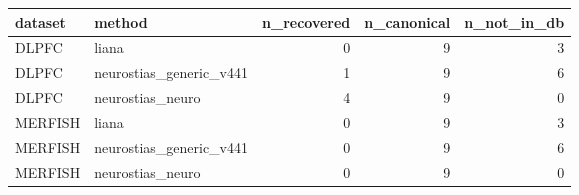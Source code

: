 \begin{tabular}{llrrr}
\toprule
dataset & method & n_recovered & n_canonical & n_not_in_db \\
\midrule
DLPFC & liana & 0 & 9 & 3 \\
DLPFC & neurostias_generic_v441 & 1 & 9 & 6 \\
DLPFC & neurostias_neuro & 4 & 9 & 0 \\
MERFISH & liana & 0 & 9 & 3 \\
MERFISH & neurostias_generic_v441 & 0 & 9 & 6 \\
MERFISH & neurostias_neuro & 0 & 9 & 0 \\
\bottomrule
\end{tabular}
